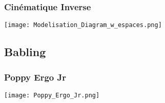 \documentclass[french]{beamer}
\begin{document}
\begin{frame}
    \frametitle{Cinématique Inverse}


    \texttt{[image: Modelisation\_Diagram\_w\_espaces.png]}
\end{frame}

\subsection{Babling}

\begin{frame}
    \frametitle{Poppy Ergo Jr}

    
    \center
    \texttt{[image: Poppy\_Ergo\_Jr.png]}
\end{frame}
\end{document}
